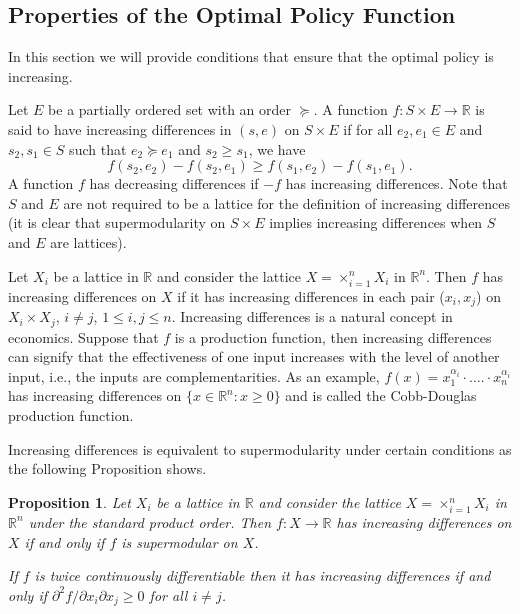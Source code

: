 \documentclass[letter,11pt]{article}
\newtheorem{proposition}{Proposition}[section]
\begin{document}
\subsection{Properties of the Optimal Policy Function}

In this section we will provide conditions that ensure that the optimal policy is increasing. 


Let $E$ be a partially ordered set with an order $\succeq$. 
A function $f :S \times E \rightarrow \mathbb{R}$ is said to have increasing differences in $(s ,e)$ on $S \times E$ if for all $e_{2} ,e_{1} \in E$ and $s_{2} ,s_{1} \in S$ such that $e_{2} \succeq e_{1}$ and $s_{2} \geq s_{1}$, we have \begin{equation*}f(s_{2} ,e_{2}) -f(s_{2} ,e_{1}) \geq f(s_{1} ,e_{2}) -f(s_{1} ,e_{1}) .
\end{equation*} A function $f$ has decreasing differences if $-f$ has increasing differences. Note that $S$ and $E$ are not required to be  a lattice for the definition of increasing differences (it is clear that supermodularity on $S \times E $ implies increasing differences when $S$ and $E$ are lattices). 


 Let $X_{i}$ be a lattice in $\mathbb{R}$ and consider the lattice $X=\times_{i=1}^{n} X_{i}$ in $\mathbb{R}^{n}$. Then $f$ has increasing differences on $X$ if it has increasing differences in each pair ($x_{i},x_{j}$) on $X_{i} \times X_{j}$, $i \neq j$, $1 \leq i,j \leq n$. 
Increasing differences is a natural concept in economics. Suppose that $f$ is a production function,  then  increasing differences can signify that the effectiveness of one input increases with the level of another input, i.e., the inputs are complementarities. As an example, $f(x) = x_{1}^{\alpha_{i} } \cdot .... \cdot x_{n}^{\alpha_{i}} $ has increasing differences on $\{x \in \mathbb{R}^{n}: x \geq 0 \}$ and is called the Cobb-Douglas production function.

 Increasing differences is equivalent to supermodularity under certain conditions as the following Proposition shows. 

\begin{proposition} \label{prop:supermodular}
    Let $X_{i}$ be a lattice in $\mathbb{R}$ and consider the lattice $X=\times_{i=1}^{n} X_{i}$ in $\mathbb{R}^{n}$ under the standard product order. Then $f:X \rightarrow \mathbb{R}$ has increasing differences on $X$ if and only if $f$ is supermodular on $X$. 
    
    If $f$ is twice  continuously differentiable then it has increasing differences if and only if $\partial ^{2} f / \partial x_{i} \partial x_{j} \geq 0$ for all $i \neq j$. 
\end{proposition}
\end{document}
